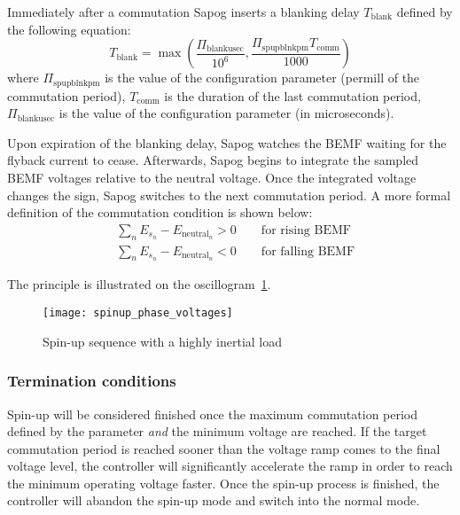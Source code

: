\documentclass{zubaxdoc}
\begin{document}
Immediately after a commutation Sapog inserts a blanking delay $T_\text{blank}$
defined by the following equation:
\begin{equation}
	T_{\text{blank}}=
	\max \left(\frac{\Pi_{\text{blankusec}}}{10^6},
	\frac{\Pi_{\text{spupblnkpm}} T_{\text{comm}}}{1000}\right)
\end{equation}
where $\Pi_{\text{spupblnkpm}}$ is the value of the configuration parameter 
(permill of the commutation period),
$T_{\text{comm}}$ is the duration of the last commutation period,
$\Pi_{\text{blankusec}}$ is the value of the configuration parameter 
(in microseconds).

Upon expiration of the blanking delay, Sapog watches the BEMF waiting for the flyback current to cease.
Afterwards, Sapog begins to integrate the sampled BEMF voltages relative to the neutral voltage.
Once the integrated voltage changes the sign, Sapog switches to the next commutation period.
A more formal definition of the commutation condition is shown below:
\begin{equation}
	\begin{aligned}
		&\sum_{n} E_{s_n} - E_{\text{neutral}_n} > 0 \qquad\text{for rising BEMF}\\
		&\sum_{n} E_{s_n} - E_{\text{neutral}_n} < 0 \qquad\text{for falling BEMF}
	\end{aligned}
\end{equation}

The principle is illustrated on the oscillogram~\ref{spinup_phase_voltages}.

\begin{figure}[hbt]
	\centering
	\texttt{[image: spinup\_phase\_voltages]}
	\caption{Spin-up sequence with a highly inertial load
		\label{spinup_phase_voltages}}
\end{figure}

\subsubsection{Termination conditions}

Spin-up will be considered finished once the maximum commutation period defined by the parameter
 \emph{and} the minimum voltage  are reached.
If the target commutation period is reached sooner than the voltage ramp comes to the final
voltage level, the controller will significantly accelerate the ramp in order to reach
the minimum operating voltage faster.
Once the spin-up process is finished,
the controller will abandon the spin-up mode and switch into the normal mode.
\end{document}
